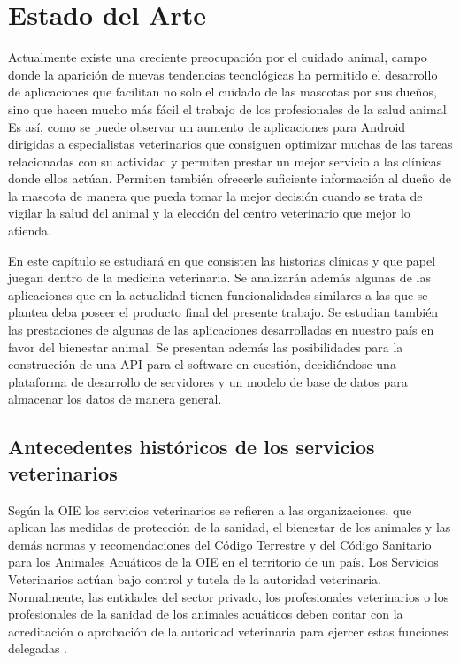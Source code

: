 \chapter{Estado del Arte}\label{chapter:state-of-the-art}

Actualmente existe una creciente preocupación por el cuidado animal, campo donde la aparición de nuevas tendencias tecnológicas ha permitido el desarrollo de aplicaciones que facilitan no solo el cuidado de las mascotas por sus dueños, sino que hacen mucho más fácil el trabajo de los profesionales de la salud animal. Es así, como se puede observar un aumento de aplicaciones para Android dirigidas a especialistas veterinarios que consiguen optimizar muchas de las tareas relacionadas con su actividad y permiten prestar un mejor servicio a las clínicas donde ellos actúan. Permiten también ofrecerle suficiente información al dueño de la mascota de manera que pueda tomar la mejor decisión cuando se trata de vigilar la salud del animal y la elección del centro veterinario que mejor lo atienda.

En este capítulo se estudiará en que consisten las historias clínicas y que papel juegan dentro de la medicina veterinaria. Se analizarán además algunas de las aplicaciones que en la actualidad tienen funcionalidades similares a las que se plantea deba poseer el producto final del presente trabajo. Se estudian también las prestaciones de algunas de las aplicaciones desarrolladas en nuestro país en favor del bienestar animal. Se presentan además las posibilidades para la construcción de una API para el software en cuestión, decidiéndose una plataforma de desarrollo de servidores y un modelo de base de datos para almacenar los datos de manera general.

\section{Antecedentes históricos de los servicios \newline veterinarios}

Según la OIE los servicios veterinarios se refieren a las organizaciones, que aplican las medidas de protección de la sanidad, el bienestar de los animales y las demás normas y recomendaciones del Código Terrestre y del Código Sanitario para los Animales Acuáticos de la OIE en el territorio de un país. Los Servicios Veterinarios actúan bajo control y tutela de la autoridad veterinaria. Normalmente, las entidades del sector privado, los profesionales veterinarios o los profesionales de la sanidad de los animales acuáticos deben contar con la acreditación o aprobación de la autoridad veterinaria para ejercer estas funciones delegadas . 

